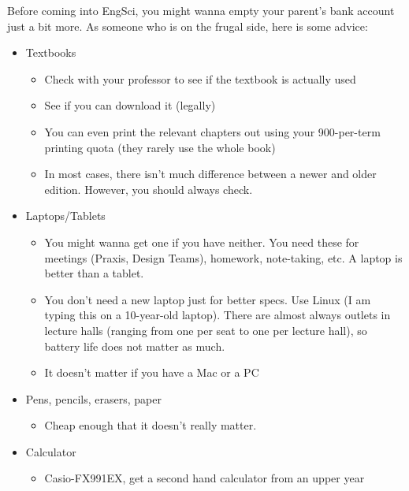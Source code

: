 Before coming into EngSci, you might wanna empty your parent's bank account just a bit more. As someone who is on the frugal side, here is some advice:

\begin{itemize}
    \item Textbooks
        \begin{itemize}
            \item Check with your professor to see if the textbook is actually used
            \item See if you can download it (legally)
            \item You can even print the relevant chapters out using your 900-per-term printing quota (they rarely use the whole book)
            \item In most cases, there isn't much difference between a newer and older edition. However, you should always check.
        \end{itemize}
    \item Laptops/Tablets
        \begin{itemize}
            \item You might wanna get one if you have neither. You need these for meetings (Praxis, Design Teams), homework, note-taking, etc. A laptop is better than a tablet.
            \item You don't need a new laptop just for better specs. Use Linux (I am typing this on a 10-year-old laptop). There are almost always outlets in lecture halls (ranging from one per seat to one per lecture hall), so battery life does not matter as much.
            \item It doesn't matter if you have a Mac or a PC
        \end{itemize}
    \item Pens, pencils, erasers, paper
        \begin{itemize}
            \item Cheap enough that it doesn't really matter.
        \end{itemize}
    \item Calculator
        \begin{itemize}
            \item Casio-FX991EX, get a second hand calculator from an upper year
        \end{itemize}
\end{itemize}
